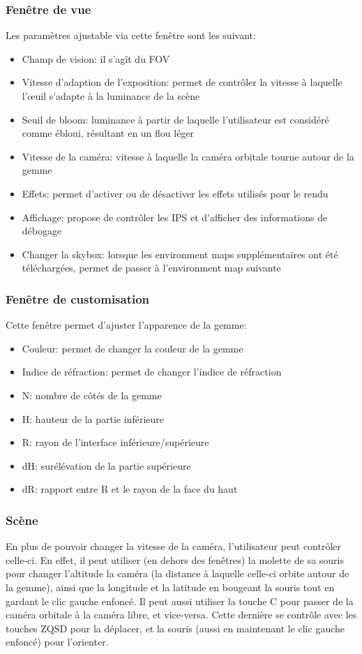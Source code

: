 \documentclass[a4paper,12pt]{article}
\begin{document}
\subsubsection{Fenêtre de vue}
Les paramètres ajustable via cette fenêtre sont les suivant:
\begin{itemize}
    \item Champ de vision: il s'agît du FOV
    \item Vitesse d'adaption de l'exposition: permet de contrôler la vitesse à laquelle l'œuil s'adapte à la luminance de la scène
    \item Seuil de bloom: luminance à partir de laquelle l'utilisateur est considéré comme ébloui, résultant en un flou léger
    \item Vitesse de la caméra: vitesse à laquelle la caméra orbitale tourne autour de la gemme
    \item Effets: permet d'activer ou de désactiver les effets utilisés pour le rendu
    \item Affichage: propose de contrôler les IPS et d'afficher des informations de débogage
    \item Changer la skybox: lorsque les environment maps supplémentaires ont été téléchargées, permet de passer à l'environment map suivante
\end{itemize}

\subsubsection{Fenêtre de customisation}
Cette fenêtre permet d'ajuster l'apparence de la gemme:
\begin{itemize}
    \item Couleur: permet de changer la couleur de la gemme
    \item Indice de réfraction: permet de changer l'indice de réfraction
    \item N: nombre de côtés de la gemme
    \item H: hauteur de la partie inférieure
    \item R: rayon de l'interface inférieure/supérieure
    \item dH: surélévation de la partie supérieure
    \item dR: rapport entre R et le rayon de la face du haut
\end{itemize}

\subsubsection{Scène}
En plus de pouvoir changer la vitesse de la caméra, l'utilisateur peut contrôler celle-ci. En effet,
il peut utiliser (en dehors des fenêtres) la molette de sa souris pour changer l'altitude la caméra
(la distance à laquelle celle-ci orbite autour de la gemme), ainsi que la longitude et la latitude
en bougeant la souris tout en gardant le clic gauche enfoncé. Il peut aussi utiliser la touche C pour
passer de la caméra orbitale à la caméra libre, et vice-versa. Cette dernière se contrôle avec les
touches ZQSD pour la déplacer, et la souris (aussi en maintenant le clic gauche enfoncé)
pour l'orienter.
\end{document}

